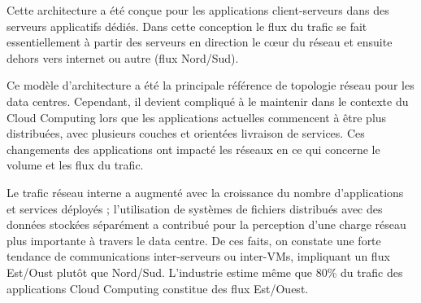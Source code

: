 


Cette architecture a été conçue pour les applications client-serveurs dans des serveurs applicatifs dédiés. Dans cette conception le flux du trafic se fait essentiellement à partir des serveurs en direction le cœur du réseau et ensuite dehors vers internet ou autre (flux Nord/Sud).

Ce modèle d'architecture a été la principale référence de topologie réseau pour les data centres. Cependant, il devient compliqué à le maintenir dans le contexte du Cloud Computing lors que les applications actuelles commencent à être plus distribuées, avec plusieurs couches et orientées livraison de services. Ces changements des applications ont impacté les réseaux en ce qui concerne le volume et les flux du trafic. 

Le trafic réseau interne a augmenté avec la croissance du nombre d'applications et services déployés ; l'utilisation de systèmes de fichiers distribués avec des données stockées séparément a contribué pour la perception d'une charge réseau plus importante à travers le data centre. De ces faits, on constate une forte tendance de communications inter-serveurs ou inter-VMs, impliquant un flux Est/Oust plutôt que Nord/Sud. L'industrie estime même que 80\% du trafic des applications Cloud Computing constitue des flux Est/Ouest.


